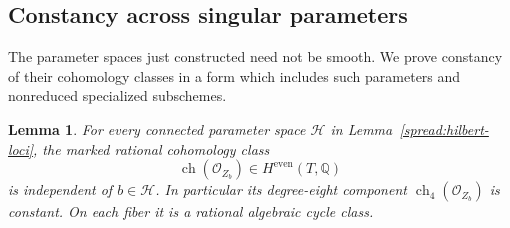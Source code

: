 \documentclass[11pt]{article}
\newtheorem{lemma}[theorem]{Lemma}
\theoremstyle{definition}
\theoremstyle{remark}
\newcommand{\Q}{\mathbb Q}
\DeclareMathOperator{\ch}{ch}
\numberwithin{equation}{section}
\begin{document}
\subsection{Constancy across singular parameters}

The parameter spaces just constructed need not be smooth.  We prove
constancy of their cohomology classes in a form which includes such
parameters and nonreduced specialized subschemes.

\begin{lemma}
\label{spread:chern-constancy}
For every connected parameter space $\mathcal H$ in
Lemma~\ref{spread:hilbert-loci}, the marked rational cohomology class
\[
 \ch(\mathcal O_{Z_b})\in H^{\mathrm{even}}(T,\Q)
\]
is independent of $b\in\mathcal H$.  In particular its degree-eight
component $\ch_4(\mathcal O_{Z_b})$ is constant.  On each fiber it is
a rational algebraic cycle class.
\end{lemma}
\end{document}
